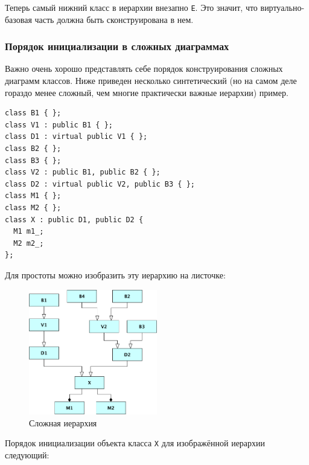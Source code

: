 \documentclass[a4paper,12pt,oneside]{article}
\begin{document}
Теперь самый нижний класс в иерархии внезапно \lstinline!E!. Это значит, что виртуально-базовая часть должна быть сконструирована в нем.

\subsubsection{Порядок инициализации в сложных диаграммах}\label{InitOrder}

Важно очень хорошо представлять себе порядок конструирования сложных диаграмм классов. Ниже приведен несколько синтетический (но на самом деле гораздо менее сложный, чем многие практически важные иерархии) пример.

\begin{lstlisting}
class B1 { };
class V1 : public B1 { };
class D1 : virtual public V1 { };
class B2 { };
class B3 { };
class V2 : public B1, public B2 { };
class D2 : virtual public V2, public B3 { };
class M1 { };
class M2 { };
class X : public D1, public D2 {
  M1 m1_;
  M2 m2_;
};
\end{lstlisting}

Для простоты можно изобразить эту иерархию на листочке:

\begin{figure}[h!]
\centering
\includegraphics[width=0.5\textwidth]{illustrations/complexhier-crop.pdf}
\caption{Сложная иерархия}
\label{fig:complexhier-crop}
\end{figure}

Порядок инициализации объекта класса \lstinline!X! для изображённой иерархии следующий:
\end{document}
